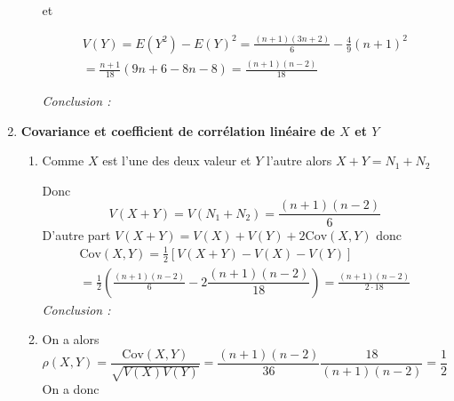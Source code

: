 \begin{enumerate}
\begin{enumerate}
et

\begin{multline*}
V\left( Y\right) 
 = E\left( Y^{2}\right) -E\left( Y\right) ^{2} 
 = \frac{\left( n+1\right) \left( 3n+2\right) }{6}-\frac{4}{9}\left(n+1\right) ^{2} \\
 = \frac{n+1}{18}\left( 9n+6-8n-8\right) 
 = \frac{\left( n+1\right) \left( n-2\right) }{18}
\end{multline*}

\textsl{Conclusion : }
\end{enumerate}

\item \textbf{Covariance et coefficient de corr\'elation lin\'eaire de $X$ et $Y$}

\begin{enumerate}
\item Comme $X$ est l'une des deux valeur et $Y$ l'autre alors $%
X+Y=N_{1}+N_{2}$

Donc 
\begin{displaymath}
V\left( X+Y\right) 
 = V\left( N_{1}+N_{2}\right) 
 = \frac{\left( n+1\right) \left( n-2\right) }{6}
\end{displaymath}
D'autre part $V\left( X+Y\right) =V\left( X\right) +V\left( Y\right) +2%
\mathrm{Cov}\left( X,Y\right) $ donc 
\begin{multline*}
\mathrm{Cov}\left( X,Y\right) 
 = \frac{1}{2}\left[ V\left( X+Y\right)-V\left( X\right) -V\left( Y\right) \right] \\
 = \frac{1}{2}\left( \frac{\left( n+1\right) \left( n-2\right) }{6}-2\dfrac{\left( n+1\right) \left( n-2\right) }{18}\right) 
 = \frac{\left( n+1\right) \left( n-2\right) }{2\cdot 18}
\end{multline*}
\textsl{Conclusion : }

\item On a alors 
\begin{displaymath}
\rho \left( X,Y\right) 
 = \frac{\mathrm{Cov}\left( X,Y\right) }{\sqrt{V\left( X\right) V\left( Y\right) }} 
 = \dfrac{\left( n+1\right) \left( n-2\right) }{36}\frac{18}{\left(n+1\right) \left( n-2\right) } 
 = \frac{1}{2}
\end{displaymath}
On a donc 
\end{enumerate}
\end{enumerate}
